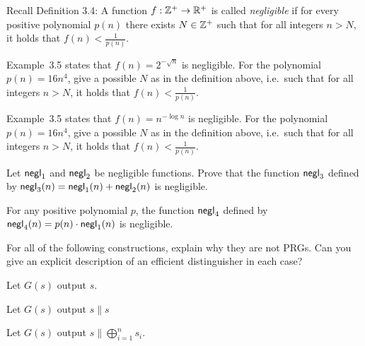 \documentclass[a4paper,10pt,landscape,twocolumn]{scrartcl}
\begin{document}
\begin{exercise}
Recall Definition 3.4: A function $f: \mathbb{Z}^+ \rightarrow \mathbb{R}^+$ is called \emph{negligible} if for
every positive polynomial $p(n)$ there exists $N \in \mathbb{Z}^+$ such that for all integers $n> N$, it holds that $f(n) < \frac{1}{p(n)}$.

\begin{subex}
Example~3.5 states that $f(n) = 2^{-\sqrt{n}}$ is negligible. For the polynomial $p(n)=16 n^4$, give a possible $N$ as in the definition above, i.e.\ such that for all integers $n > N$, it holds that $f(n) < \frac{1}{p(n)}$.
\end{subex}

\begin{subex}
Example~3.5 states that $f(n) = n^{-\log{n}}$ is negligible. For the polynomial $p(n)=16 n^4$, give a possible $N$ as in the definition above, i.e.\ such that for all integers $n > N$, it holds that $f(n) < \frac{1}{p(n)}$.
\end{subex}

\begin{subex**}
Let $\mathsf{negl}_1$ and $\mathsf{negl}_2$ be negligible functions. Prove that the function $\mathsf{negl}_3$ defined by $\mathsf{negl}_3(n) = \mathsf{negl}_1(n)+\mathsf{negl}_2(n)$ is negligible.
\end{subex**}

\begin{subex**}
For any positive polynomial $p$, the function $\mathsf{negl}_4$ defined
  by $\mathsf{negl}_4(n) = p(n) \cdot \mathsf{negl}_1(n)$ is negligible.
\end{subex**}

\end{exercise}


\begin{exercise}
For all of the following constructions, explain why they are not PRGs.
Can you give an explicit description of an efficient distinguisher in
each case?

\begin{subex}
Let $G(s)$ output $s$.
\end{subex}

\begin{subex}
Let $G(s)$ output $s \| s$
\end{subex}

\begin{subex}
Let $G(s)$ output $s \| \bigoplus_{i=1}^n s_i$.
\end{subex}

\end{exercise}
\end{document}
